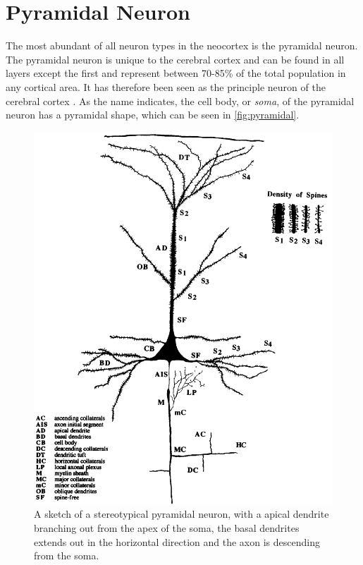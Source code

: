 \section{Pyramidal Neuron}
\label{sec:dendrite}
The most abundant of all neuron types in the neocortex is the pyramidal neuron. The pyramidal neuron is unique to the cerebral cortex and can be found in all layers except the first and represent between 70-85\% of the total population in any cortical area. It has therefore been seen as the principle neuron of the cerebral cortex \cite{PyramidalPop}. As the name indicates, the cell body, or \textit{soma}, of the pyramidal neuron has a pyramidal shape, which can be seen in \autoref{fig:pyramidal}.


\begin{figure}[ht!]
    \centering
    \includegraphics[scale=.3]{appendix/neuroscience/figures/PyramidalNeuron.png}
    \caption{\cite{PyramidalPop} A sketch of a stereotypical pyramidal neuron, with a apical dendrite branching out from the apex of the soma, the basal dendrites extends out in the horizontal direction and the axon is descending from the soma.}
    \label{fig:pyramidal}
\end{figure}


